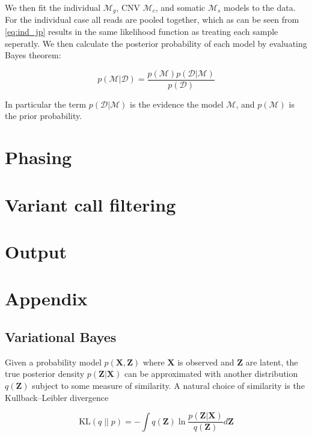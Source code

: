 \documentclass{article}
\begin{document}
We then fit the individual $\mathcal{M}_g$, CNV $\mathcal{M}_c$, and somatic $\mathcal{M}_s$ models to the data. For the individual case all reads are pooled together, which as can be seen from \ref{eq:ind_jp} results in the same likelihood function as treating each sample seperatly. We then calculate the posterior probability of each model by evaluating Bayes theorem:

\begin{equation}
\label{eq:bayes_model}
p(\mathcal{M} | \mathcal{D}) = \frac{p(\mathcal{M})p(\mathcal{D} | \mathcal{M})}{p(\mathcal{D})}
\end{equation}

In particular the term $p(\mathcal{D} | \mathcal{M})$  is the evidence the model $\mathcal{M}$, and $p(\mathcal{M})$ is the prior probability.

\section{Phasing}

\section{Variant call filtering}

\section{Output}

\section{Appendix}

\subsection{Variational Bayes}

Given a probability model $p(\boldsymbol{X}, \boldsymbol{Z})$ where $\boldsymbol{X}$ is observed and $\boldsymbol{Z}$ are latent, the true posterior density $p(\boldsymbol{Z} | \boldsymbol{X})$ can be approximated with another distribution $q(\boldsymbol{Z})$ subject to some measure of similarity. A natural choice of similarity is the Kullback–Leibler divergence

\begin{equation}
\label{eq:kl}
   \text{KL} (q\; ||\; p) = -\int q(\boldsymbol{Z}) \ln \frac{p(\boldsymbol{Z} | \boldsymbol{X})}{q(\boldsymbol{Z})} d\boldsymbol{Z}
\end{equation}
\end{document}
